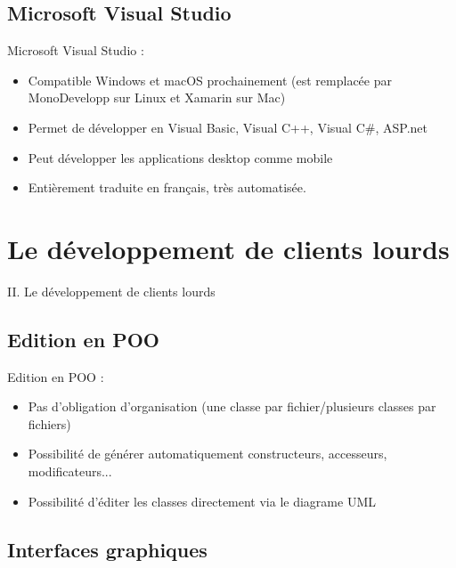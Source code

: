 \documentclass{beamer}
\begin{document}
\subsection{Microsoft Visual Studio}

\begin{frame}{Microsoft Visual Studio :}
  \begin{itemize}
  \item {
    Compatible Windows et macOS prochainement (est remplacée par MonoDevelopp sur Linux et Xamarin sur Mac)
    \pause
  }
  \item {   
    Permet de développer en Visual Basic, Visual C++, Visual C\#, ASP.net
    \pause
  }
  \item {
    Peut développer les applications desktop comme mobile
    \pause
  }
  \item {
    Entièrement traduite en français, très automatisée.
  }
  \end{itemize}
\end{frame}

\section{Le développement de clients lourds}
    \begin{frame}{}
    \LARGE II. Le développement de clients lourds
    \end{frame}

\subsection{Edition en POO}

\begin{frame}{Edition en POO :}
  \begin{itemize}
  \item {
    Pas d'obligation d'organisation (une classe par fichier/plusieurs classes par fichiers)
    \pause
  }
  \item {   
    Possibilité de générer automatiquement constructeurs, accesseurs, modificateurs...
    \pause
  }
  \item {
    Possibilité d'éditer les classes directement via le diagrame UML
    \pause
  }
  \end{itemize}
\end{frame}

\subsection{Interfaces graphiques}
\end{document}
